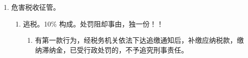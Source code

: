 \begin{enumerate}
\begin{enumerate}
\begin{enumerate}
                        \begin{kk}{其他}
                          \begin{enumerate}
                            \item 先非法获取后使用。一律定信用卡诈骗。。
                            \item 微信、支付宝信息资料。盗划、盗刷 \yjt 一律定盗窃罪。
                                  。
                            \item 蚂蚁花呗/借呗。本质是消费信贷、垫付/放贷资金 \yjt 贷款诈骗。
                          \end{enumerate}
                        \end{kk}
                \end{enumerate}
          \item 票据诈骗。。
          \item 集资类犯罪。
                \begin{enumerate}
                  \item {}。
                        \begin{enumerate}
                          \item 没有非法占有目的。不包含亲友、内部人员。
                          \item {}。
                        \end{enumerate}
                  \item {}。以非法占有为目的，使用诈骗方法非法集资的行为，达到骗取集资款的目的。其“诈骗方法”是指行为人采取虚构集资用途，以虚假的证明文件和高回报率为诱饵，骗取集资款的手段。最高无期。。
                  \item 擅自发行股票、公司、企业债券。
                \end{enumerate}
        \end{enumerate}
  \item 危害税收征管。
        \begin{enumerate}
          \item 逃税。10\% 构成。处罚阻却事由，独一份！！
                \begin{enumerate}
                  \item 有第一款行为，经税务机关依法下达追缴通知后，补缴应纳税款，缴纳滞纳金，已受行政处罚的，不予追究刑事责任。

\end{enumerate}
\end{enumerate}
\end{enumerate}
